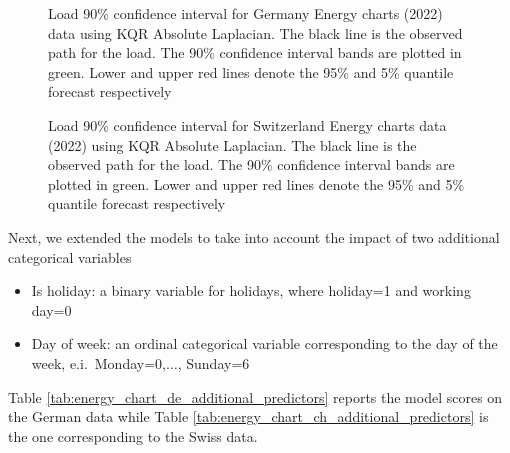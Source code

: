     \begin{figure}[!ht]
        \caption[Probabilistic forecast for load in Germany]{Load 90\% confidence interval for Germany Energy charts (2022) data using KQR Absolute Laplacian. The black line is the observed path for the load. The 90\% confidence interval bands are plotted in green. Lower and upper red lines denote the 95\% and 5\% quantile forecast respectively}
        \label{fig:DE_load_CI}
    \end{figure}
    

    \begin{figure}[!ht]
        \caption[Probabilistic forecast for load in Switzerland]{Load 90\% confidence interval for Switzerland Energy charts data (2022) using KQR Absolute Laplacian. The black line is the observed path for the load. The 90\% confidence interval bands are plotted in green. Lower and upper red lines denote the 95\% and 5\% quantile forecast respectively}
        \label{fig:CH_load_CI}
    \end{figure}
    
Next, we extended the models to take into account the impact of two additional categorical variables
\begin{itemize}
    \item Is holiday: a binary variable for holidays, where holiday=1 and working day=0
    \item Day of week: an ordinal categorical variable corresponding to the day of the week, e.i.\ Monday=0,$\dots$, Sunday=6
\end{itemize}
Table \ref{tab:energy_chart_de_additional_predictors} reports the model scores on the German data while Table \ref{tab:energy_chart_ch_additional_predictors} is the one corresponding to the Swiss data.


